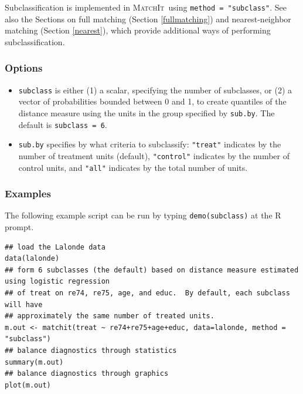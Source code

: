 \documentclass[oneside,letterpaper,titlepage]{article}
\newcommand{\MatchIt}{\textsc{MatchIt}}
\begin{document}
Subclassification is implemented in \MatchIt\ using \texttt{method =
  "subclass"}.  See also the Sections on full matching (Section
\ref{fullmatching}) and nearest-neighbor matching (Section \ref{nearest}),
which provide additional ways of performing subclassification.

\subsubsection{Options}

\begin{itemize}
\item \texttt{subclass} is either (1) a scalar, specifying the number
  of subclasses, or (2) a vector of probabilities bounded between 0
  and 1, to create quantiles of the distance measure using the units
  in the group specified by \texttt{sub.by}.  The default is
  \texttt{subclass = 6}.
\item \texttt{sub.by} specifies by what criteria to subclassify:
  \texttt{"treat"} indicates by the number of treatment units
  (default), \texttt{"control"} indicates by the number of control
  units, and \texttt{"all"} indicates by the total number of units.
  \end{itemize}

\subsubsection{Examples}

The following example script can be run by typing {\tt demo(subclass)}
at the R prompt.

\begin{verbatim}
## load the Lalonde data
data(lalonde)
## form 6 subclasses (the default) based on distance measure estimated using logistic regression
## of treat on re74, re75, age, and educ.  By default, each subclass will have
## approximately the same number of treated units. 
m.out <- matchit(treat ~ re74+re75+age+educ, data=lalonde, method = "subclass")
## balance diagnostics through statistics
summary(m.out)
## balance diagnostics through graphics
plot(m.out)
\end{verbatim}
\end{document}
